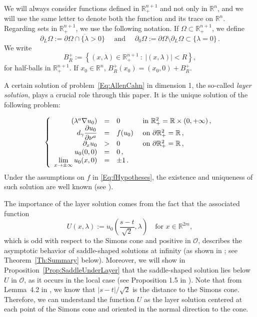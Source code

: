\documentclass[12pt,reqno]{amsart}
\theoremstyle{definition}
\theoremstyle{remark}
\newcommand{\con}[1]{\mathbb{#1}}
\newcommand{\R}{\con{R}} %
\newcommand{\ocal}{\mathcal{O}}
\newcommand{\s}{\gamma}
\newcommand{\setcond}[2]{\left \{ #1 \ : \ #2  \right \}}
\newcommand\beqc[1]{\left\{\begin{array}{#1}}
\newcommand\eeqc{\end{array} \right.}
\def\PDEsystem{rcll}
\let\div\relax
\DeclareMathOperator{\div}{div}
\def\ds{\displaystyle}
\numberwithin{equation}{section}
\begin{document}
We will always consider functions defined in $\R^{n+1}_+$ and not only in $\R^n$, and we will use the same letter to denote both the function and its trace on $\R^n$. Regarding sets in $\R^{n+1}_+$, we use the following notation. If $\Omega \subset \R^{n+1}_+$, we define
$$
\partial_L \Omega := \overline{\partial \Omega \cap \{\lambda > 0\}}
 \quad \text{ and } \quad \partial_0 \Omega := \partial \Omega \setminus \partial_L \Omega \subset \{\lambda = 0\}\,.
$$
We write
$$
B_{R}^+ := \setcond{(x,\lambda)\in \R^{n+1}_+}{|(x,\lambda)|< R},
$$
for half-balls in $\R^{n+1}_+$. If $x_0\in \R^n$, $B_{R}^+(x_0)=(x_0,0)+B_{R}^+$.


A certain solution of problem~\eqref{Eq:AllenCahn} in dimension 1, the so-called \emph{layer solution}, plays a crucial role through this paper. It is the unique solution of the following problem:

\begin{equation}
\label{Eq:LayerSolution}
\beqc{\PDEsystem}
\div(\lambda^a \nabla u_0) &=& 0 & \textrm{ in } \R^{2}_+ = \R \times (0, +\infty)\,, \\
d_\s \dfrac{\partial u_0}{\partial \nu^a} &=& f(u_0) & \textrm{ on } \partial \R^{2}_+ = \R\,,\\
\partial_x u_0 &>& 0 & \textrm{ on } \partial \R^{2}_+ = \R\,,\\
u_0 (0,0) &=& 0 \,,\\
\ds \lim_{x\to\pm \infty} u_0 (x,0) &=& \pm 1\,.
\eeqc
\end{equation}
Under the assumptions on $f$ in \eqref{Eq:fHypotheses}, the existence and uniqueness of such solution are well known (see \cite{CabreSireI}).

The importance of the layer solution comes from the fact that the associated function
\begin{equation}
\label{Eq:DefULayer}
U(x,\lambda) := u_0\left( \frac{s-t}{\sqrt{2}},\lambda \right) \ \ \ \text{ for } x\in\R^{2m},
\end{equation}
which is odd with respect to the Simons cone and positive in $\ocal$, describes the asymptotic behavior of saddle-shaped solutions at infinity (as shown in \cite{Cinti-Saddle, Cinti-Saddle2}; see Theorem~\ref{Th:Summary} below). Moreover, we will show in Proposition~\ref{Prop:SaddleUnderLayer} that the saddle-shaped solution lies below $U$ in $\ocal$, as it occurs in the local case (see Proposition 1.5 in \cite{CabreTerraI}). Note that from Lemma~4.2 in \cite{CabreTerraI}, we know that $|s-t|/\sqrt{2}$ is the distance to the Simons cone. Therefore, we can understand the function $U$ as the layer solution centered at each point of the Simons cone and oriented in the normal direction to the cone.
\end{document}
